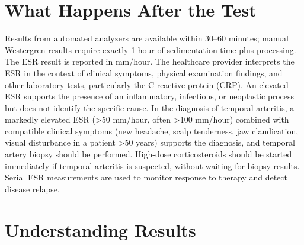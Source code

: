 \section*{What Happens After the Test}
Results from automated analyzers are available within 30--60 minutes; manual Westergren results require exactly 1 hour of sedimentation time plus processing. The ESR result is reported in mm/hour. The healthcare provider interprets the ESR in the context of clinical symptoms, physical examination findings, and other laboratory tests, particularly the C-reactive protein (CRP). An elevated ESR supports the presence of an inflammatory, infectious, or neoplastic process but does not identify the specific cause. In the diagnosis of temporal arteritis, a markedly elevated ESR (>50 mm/hour, often >100 mm/hour) combined with compatible clinical symptoms (new headache, scalp tenderness, jaw claudication, visual disturbance in a patient >50 years) supports the diagnosis, and temporal artery biopsy should be performed. High-dose corticosteroids should be started immediately if temporal arteritis is suspected, without waiting for biopsy results. Serial ESR measurements are used to monitor response to therapy and detect disease relapse.

\section*{Understanding Results}

